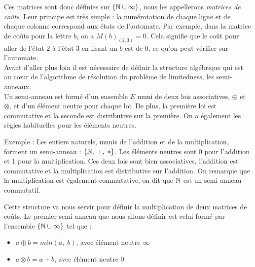 \documentclass[12pt]{memoir}
\begin{document}
Ces matrices sont donc définies sur $\{\mathbb{N} \cup \infty\}$, nous les appellerons
\emph{matrices de coûts}. Leur principe est très simple : la numérotation de chaque ligne et de chaque colonne correspond aux états de l'automate. Par exemple, dans la matrice de coûts pour la lettre $b$, on a $M(b)_{(2,3)}=0$. Cela signifie que le coût pour aller de l'état 2 à l'état 3 en lisant un $b$ est de 0, ce qu'on peut vérifier sur l'automate. \\

Avant d'aller plus loin il est nécessaire de définir la structure algébrique qui est au cœur de l'algorithme de résolution du problème de limitedness, les semi-anneaux.\\
Un semi-anneau est formé d'un ensemble $E$ muni de deux lois associatives,
$\oplus$ et $\otimes$, et d'un élément neutre pour chaque loi. De plus, la
première loi est commutative et la seconde est distributive sur la
première. On a également les règles habituelles pour les éléments neutres.

\medskip\noindent
Exemple : Les entiers naturels, munis de l'addition et de la multiplication,
forment un semi-anneau : $\{ \mathbb{N},\;+,\;* \}$. Les éléments neutres sont 0 pour
l'addition et 1 pour la multiplication. Ces deux lois sont bien associatives,
l'addition est commutative et la multiplication est distributive sur
l'addition. On remarque que la multiplication est également commutative, on
dit que $\mathbb{N}$ est un semi-anneau commutatif.

\medskip
Cette structure va nous servir pour définir la multiplication de deux matrices de coûts. Le premier semi-anneau que nous allons définir est celui formé par l'ensemble $\{\mathbb{N} \cup \infty\}$ tel que :
\begin{itemize}
\item $a \oplus b = min(a,\;b)$, avec élément neutre $\infty$
\item $a \otimes b = a + b$, avec élément neutre $0$
\end{itemize}
$\ $
\end{document}
